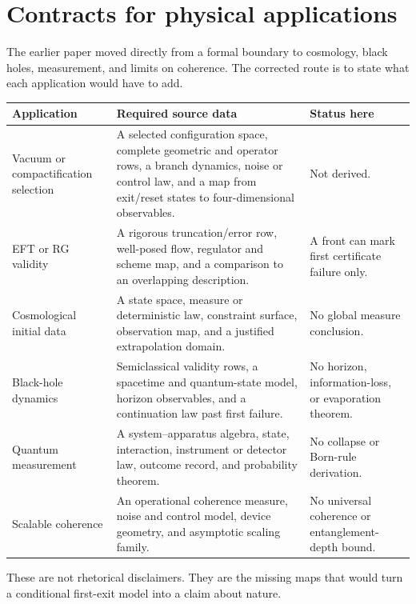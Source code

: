\documentclass[11pt]{article}
\theoremstyle{definition}
\theoremstyle{remark}
\begin{document}
\section{Contracts for physical applications}
\label{sec:applications}

The earlier paper moved directly from a formal boundary to cosmology,
black holes, measurement, and limits on coherence.  The corrected route is
to state what each application would have to add.

\begin{center}
\begin{tabularx}{\textwidth}{@{}L{0.20\textwidth}Y Y@{}}
\toprule
Application & Required source data & Status here \\
\midrule
Vacuum or compactification selection
& A selected configuration space, complete geometric and operator rows,
  a branch dynamics, noise or control law, and a map from exit/reset states
  to four-dimensional observables.
& Not derived.\\

EFT or RG validity
& A rigorous truncation/error row, well-posed flow, regulator and scheme
  map, and a comparison to an overlapping description.
& A front can mark first certificate failure only.\\

Cosmological initial data
& A state space, measure or deterministic law, constraint surface,
  observation map, and a justified extrapolation domain.
& No global measure conclusion.\\

Black-hole dynamics
& Semiclassical validity rows, a spacetime and quantum-state model,
  horizon observables, and a continuation law past first failure.
& No horizon, information-loss, or evaporation theorem.\\

Quantum measurement
& A system--apparatus algebra, state, interaction, instrument or detector
  law, outcome record, and probability theorem.
& No collapse or Born-rule derivation.\\

Scalable coherence
& An operational coherence measure, noise and control model, device
  geometry, and asymptotic scaling family.
& No universal coherence or entanglement-depth bound.\\
\bottomrule
\end{tabularx}
\end{center}

These are not rhetorical disclaimers.  They are the missing maps that
would turn a conditional first-exit model into a claim about nature.
\end{document}
